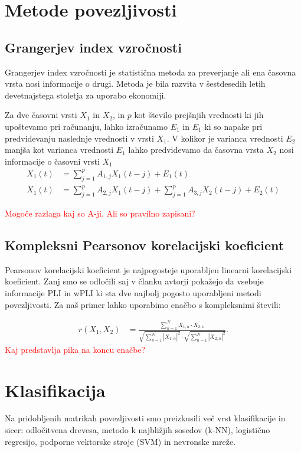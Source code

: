 \section{Metode povezljivosti}
\subsection{Grangerjev index vzročnosti}
Grangerjev index vzročnosti je statistična metoda za preverjanje ali ena časovna vrsta nosi informacije o drugi. Metoda je bila razvita v šestdesedih letih devetnajstega stoletja za uporabo ekonomiji.

Za dve časovni vrsti $X_1$ in $X_2$, in $p$ kot število prejšnjih vrednosti ki jih upoštevamo pri računanju, lahko izračunamo $E_1$ in $E_1$ ki so napake pri predvidevanju naslednje vrednosti v vrsti $X_1$. V kolikor je varianca vrednosti $E_2$ manjša kot varianca vrednosti $E_1$ lahko predvidevamo da časovna vrsta $X_2$ nosi informacije o časovni vrsti $X_1$
\begin{align*}
X_1(t) &= \sum_{j=1}^{p} A_{1,j} X_1(t-j) + E_1(t)\\
X_1(t) &= \sum_{j=1}^{p} A_{2,j} X_1(t-j) + \sum_{j=1}^{p} A_{3,j} X_2(t-j) + E_2(t)
\end{align*}


\textcolor{red}{Mogoče razlaga kaj so A-ji. Ali so pravilno zapisani?}

\cite{seth_granger_2007}

\subsection{Kompleksni Pearsonov korelacijski koeficient}
Pearsonov korelacijski koeficient je najpogosteje uporabljen linearni korelacijski koeficient. Zanj smo se odločili saj v članku   avtorji pokažejo da vsebuje informacije PLI in wPLI ki sta dve najbolj pogosto uporabljeni metodi povezljivosti. Za naš primer lahko uporabimo enačbo s kompleksnimi števili:

\begin{align*}
r(X_1, X_2) &= \frac{\sum\limits_{n=1}^{N} X_{1,n} \cdot \overline{X_{2,n}}}{\sqrt{\sum\limits_{n=1}^{N} |X_{1,n}|^2} \cdot \sqrt{\sum\limits_{n=1}^{N} |X_{2,n}|^2}}.
\end{align*}
\textcolor{red}{Kaj predstavlja pika na koncu enačbe?}


\cite{sverko_complex_2022} 

\section{Klasifikacija}
Na pridobljenih matrikah povezljivosti smo preizkusili več vrst klasifikacije in sicer: odločitvena drevesa, metodo k najbližjih sosedov (k-NN), logistično regresijo, podporne vektorske stroje (SVM) in nevronske mreže.
